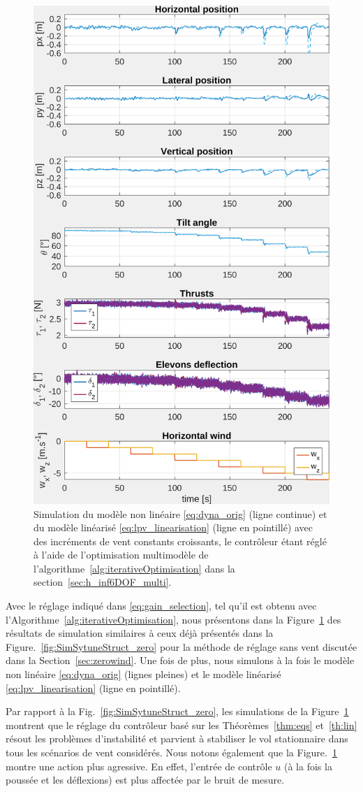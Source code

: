 \begin{figure}[ht!]
    \centering
    \includegraphics[trim=0cm 0cm 0cm 0cm,clip,width=0.6\columnwidth]{figures/sim_systune_lpv_noise.png}
    \caption{Simulation du modèle non linéaire \eqref{eq:dyna_orig} (ligne continue) et du modèle linéarisé \eqref{eq:lpv_linearisation} (ligne en pointillé) avec des incréments de vent constants croissants, le contrôleur étant réglé à l'aide de l'optimisation multimodèle de l'algorithme~\ref{alg:iterativeOptimisation} dans la section~\ref{sec:h_inf6DOF_multi}.}
    \label{fig:SimSytuneStruct_lpv}
\end{figure}

Avec le réglage indiqué dans \eqref{eq:gain_selection}, tel qu'il est obtenu avec l'Algorithme~\ref{alg:iterativeOptimisation}, nous présentons dans la Figure~\ref{fig:SimSytuneStruct_lpv} des résultats de simulation similaires à ceux déjà présentés dans la Figure.~\ref{fig:SimSytuneStruct_zero} pour la méthode de réglage sans vent discutée dans la Section~\ref{sec:zerowind}. Une fois de plus, nous simulons à la fois le modèle non linéaire \eqref{eq:dyna_orig} (lignes pleines) et le modèle linéarisé \eqref{eq:lpv_linearisation} (ligne en pointillé). 

Par rapport à la Fig.~\ref{fig:SimSytuneStruct_zero}, les simulations de la Figure~\ref{fig:SimSytuneStruct_lpv} montrent que le réglage du contrôleur basé sur les Théorèmes~\ref{thm:eqs} et~\ref{th:lin} résout les problèmes d'instabilité et parvient à stabiliser le vol stationnaire dans tous les scénarios de vent considérés. Nous notons également que la Figure.~\ref{fig:SimSytuneStruct_lpv} montre une action plus agressive. En effet, l'entrée de contrôle $u$ (à la fois la poussée et les déflexions) est plus affectée par le bruit de mesure.

